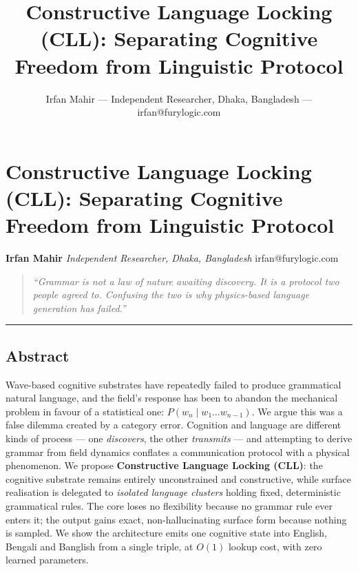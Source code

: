 \documentclass[
  11pt,
  a4paper,
]{article}
\title{Constructive Language Locking (CLL): Separating Cognitive Freedom
from Linguistic Protocol}
\author{Irfan Mahir --- Independent Researcher, Dhaka, Bangladesh ---
irfan@furylogic.com}
\date{}
\begin{document}
\maketitle

{
\hypersetup{linkcolor=}
\setcounter{tocdepth}{3}
\tableofcontents
}
\section{Constructive Language Locking (CLL): Separating Cognitive
Freedom from Linguistic
Protocol}\label{constructive-language-locking-cll-separating-cognitive-freedom-from-linguistic-protocol}

\textbf{Irfan Mahir} \emph{Independent Researcher, Dhaka, Bangladesh}
irfan@furylogic.com

\begin{quote}
\emph{``Grammar is not a law of nature awaiting discovery. It is a
protocol two people agreed to. Confusing the two is why physics-based
language generation has failed.''}
\end{quote}

\begin{center}\rule{0.5\linewidth}{0.5pt}\end{center}

\subsection{Abstract}\label{abstract}

Wave-based cognitive substrates have repeatedly failed to produce
grammatical natural language, and the field's response has been to
abandon the mechanical problem in favour of a statistical one:
\(P(w_n \mid w_1 \ldots w_{n-1})\). We argue this was a false dilemma
created by a category error. Cognition and language are different kinds
of process --- one \emph{discovers}, the other \emph{transmits} --- and
attempting to derive grammar from field dynamics conflates a
communication protocol with a physical phenomenon. We propose
\textbf{Constructive Language Locking (CLL)}: the cognitive substrate
remains entirely unconstrained and constructive, while surface
realisation is delegated to \emph{isolated language clusters} holding
fixed, deterministic grammatical rules. The core loses no flexibility
because no grammar rule ever enters it; the output gains exact,
non-hallucinating surface form because nothing is sampled. We show the
architecture emits one cognitive state into English, Bengali and
Banglish from a single triple, at \(O(1)\) lookup cost, with zero
learned parameters.
\end{document}
